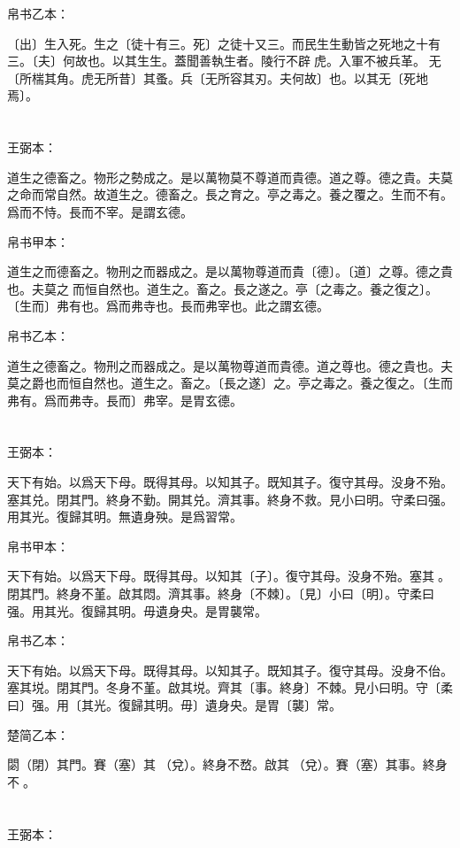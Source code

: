 \documentclass[a5paper]{ctexbook}
\begin{document}
    帛书乙本：

    〔出〕生入死。生之〔徒十有三。死〕之徒十又三。而民生生動皆之死地之十有三。〔夫〕何故也。以其生生。蓋聞善執生者。陵行不辟𧰽虎。入軍不被兵革。𧰽无〔所椯其角。虎无所昔〕其蚤。兵〔无所容其刃。夫何故〕也。以其无〔死地焉〕。

    \chapter{}
    王弼本：

    道生之德畜之。物形之勢成之。是以萬物莫不尊道而貴德。道之尊。德之貴。夫莫之命而常自然。故道生之。德畜之。長之育之。亭之毒之。養之覆之。生而不有。爲而不恃。長而不宰。是謂玄德。

    
    帛书甲本：

    道生之而德畜之。物刑之而器成之。是以萬物尊道而貴〔德〕。〔道〕之尊。德之貴也。夫莫之𡬠而恒自然也。道生之。畜之。長之遂之。亭〔之毒之。養之復之〕。〔生而〕弗有也。爲而弗寺也。長而弗宰也。此之謂玄德。

    帛书乙本：

    道生之德畜之。物刑之而器成之。是以萬物尊道而貴德。道之尊也。德之貴也。夫莫之爵也而恒自然也。道生之。畜之。〔長之遂〕之。亭之毒之。養之復之。〔生而弗有。爲而弗寺。長而〕弗宰。是胃玄德。

    \chapter{}
    王弼本：

    天下有始。以爲天下母。既得其母。以知其子。既知其子。復守其母。没身不殆。塞其兑。閉其門。終身不勤。開其兑。濟其事。終身不救。見小曰明。守柔曰强。用其光。復歸其明。無遺身殃。是爲習常。

    
    帛书甲本：

    天下有始。以爲天下母。既得其母。以知其〔子〕。復守其母。没身不殆。塞其󱁂。閉其門。終身不堇。啟其悶。濟其事。終身〔不棘〕。〔見〕小曰〔明〕。守柔曰强。用其光。復歸其明。毋遺身央。是胃襲常。

    帛书乙本：

    天下有始。以爲天下母。既得其母。以知其子。既知其子。復守其母。没身不佁。塞其㙂。閉其門。冬身不堇。啟其㙂。齊其〔事。終身〕不棘。見小曰明。守〔柔曰〕强。用〔其光。復歸其明。毋〕遺身央。是胃〔襲〕常。

    楚简乙本：

    閟（閉）其門。賽（塞）其𨓚（兌）。終身不嵍。啟其𨓚（兌）。賽（塞）其事。終身不󶵠。

    \chapter{}
    王弼本：
\end{document}
